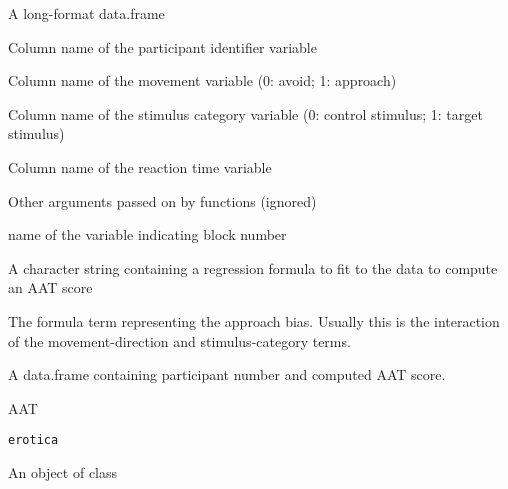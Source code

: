 \documentclass[a4paper]{book}
\begin{document}
\begin{Arguments}
\begin{ldescription}
\item[\code{ds}] A long-format data.frame

\item[\code{subjvar}] Column name of the participant identifier variable

\item[\code{pullvar}] Column name of the movement variable (0: avoid; 1: approach)

\item[\code{targetvar}] Column name of the stimulus category variable (0: control stimulus; 1: target stimulus)

\item[\code{rtvar}] Column name of the reaction time variable

\item[\code{...}] Other arguments passed on by functions (ignored)

\item[\code{blockvar}] name of the variable indicating block number

\item[\code{formula}] A character string containing a regression formula to fit to the data to compute an AAT score

\item[\code{aatterm}] The formula term representing the approach bias. Usually this is the interaction of the movement-direction and stimulus-category terms.
\end{ldescription}
\end{Arguments}
%
\begin{Value}
A data.frame containing participant number and computed AAT score.
\end{Value}
%
\begin{Description}\relax
AAT
\end{Description}
%
\begin{Usage}
\begin{verbatim}
erotica
\end{verbatim}
\end{Usage}
%
\begin{Format}
An object of class 
\end{Format}
%
\begin{Source}\relax
{}
\end{Source}
\end{document}
